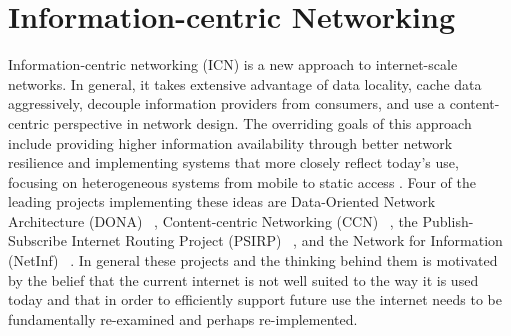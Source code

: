 \section{Information-centric Networking}
\label{section:information-centric-networking}
Information-centric networking (ICN) is a new approach to internet-scale networks.  In general, it takes extensive advantage of data locality, cache data aggressively, decouple information providers from consumers, and use a content-centric perspective in network design. The overriding goals of this approach include providing higher information availability through better network resilience and implementing systems that more closely reflect today's use, focusing on heterogeneous systems from mobile to static access \cite{6231276}.  Four of the leading projects implementing these ideas are Data-Oriented Network Architecture (DONA) ~\cite{Koponen:2007:DNA:1282427.1282402}, Content-centric Networking (CCN) ~\cite{NDN,CCNx}, the Publish-Subscribe Internet Routing Project (PSIRP) ~\cite{PSIRP}, and the Network for Information (NetInf) ~\cite{NetInf}.  In general these projects and the thinking behind them is motivated by the belief that the current internet is not well suited to the way it is used today and that in order to efficiently support future use the internet needs to be fundamentally re-examined and perhaps re-implemented.

%		

